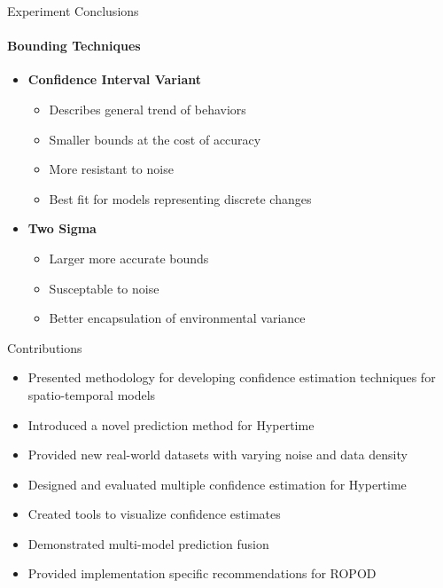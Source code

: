 \documentclass{beamer}
\begin{document}
\begin{frame}[t]{Experiment Conclusions}
  \framesubtitle{Bounding Techniques}
  \vspace*{+.25cm}

  \begin{itemize}
  \setlength\itemsep{1.25em}
    \item \textbf{Confidence Interval Variant}
      \begin{itemize}
        \item Describes general trend of behaviors
        \item Smaller bounds at the cost of accuracy
        \item More resistant to noise
        \item Best fit for models representing discrete changes
      \end{itemize}

    \item \textbf{Two Sigma}
      \begin{itemize}
        \item Larger more accurate bounds
        \item Susceptable to noise
        \item Better encapsulation of environmental variance
      \end{itemize}

  \end{itemize}
\end{frame}


\begin{frame}[t]{Contributions}

  \begin{itemize}
    \setlength\itemsep{1em}
        \item Presented methodology for developing confidence estimation techniques for spatio-temporal models

        \item Introduced a novel prediction method for Hypertime

        \item Provided new real-world datasets with varying noise and data density

        \item Designed and evaluated multiple confidence estimation for Hypertime

        \item Created tools to visualize confidence estimates

        \item Demonstrated multi-model prediction fusion

        \item Provided implementation specific recommendations for ROPOD

  \end{itemize}

\end{frame}
\end{document}
